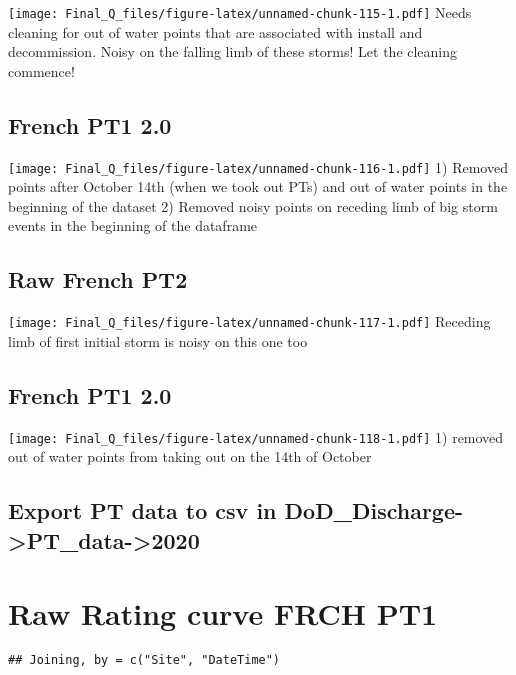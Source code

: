 \documentclass[
]{article}
\begin{document}
\texttt{[image: Final\_Q\_files/figure-latex/unnamed-chunk-115-1.pdf]}
Needs cleaning for out of water points that are associated with install
and decommission. Noisy on the falling limb of these storms! Let the
cleaning commence!

\hypertarget{french-pt1-2.0}{%
\subsection{French PT1 2.0}\label{french-pt1-2.0}}

\texttt{[image: Final\_Q\_files/figure-latex/unnamed-chunk-116-1.pdf]} 1)
Removed points after October 14th (when we took out PTs) and out of
water points in the beginning of the dataset 2) Removed noisy points on
receding limb of big storm events in the beginning of the dataframe

\hypertarget{raw-french-pt2-1}{%
\subsection{Raw French PT2}\label{raw-french-pt2-1}}

\texttt{[image: Final\_Q\_files/figure-latex/unnamed-chunk-117-1.pdf]}
Receding limb of first initial storm is noisy on this one too

\hypertarget{french-pt1-2.0-1}{%
\subsection{French PT1 2.0}\label{french-pt1-2.0-1}}

\texttt{[image: Final\_Q\_files/figure-latex/unnamed-chunk-118-1.pdf]} 1)
removed out of water points from taking out on the 14th of October

\hypertarget{export-pt-data-to-csv-in-dod_discharge-pt_data-2020-1}{%
\subsection{Export PT data to csv in
DoD\_Discharge-\textgreater PT\_data-\textgreater2020}\label{export-pt-data-to-csv-in-dod_discharge-pt_data-2020-1}}

\hypertarget{raw-rating-curve-frch-pt1}{%
\section{Raw Rating curve FRCH PT1}\label{raw-rating-curve-frch-pt1}}

\begin{verbatim}
## Joining, by = c("Site", "DateTime")
\end{verbatim}
\end{document}
